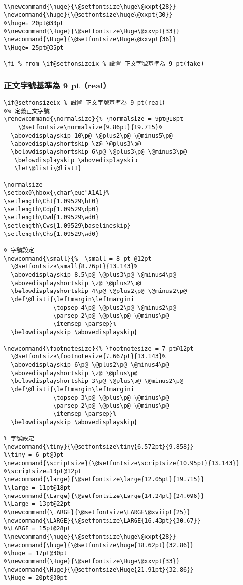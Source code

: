 \begin{lstlisting}[firstnumber=143]
	%		因正文夾注排版需要特將此設定爲 2 倍行距为宜

%\newcommand{\huge}{\@setfontsize\huge\@xxpt{28}}
\newcommand{\huge}{\@setfontsize\huge\@xxpt{30}}    				    %\huge= 20pt@30pt
%\newcommand{\Huge}{\@setfontsize\Huge\@xxvpt{33}}
\newcommand{\Huge}{\@setfontsize\Huge\@xxvpt{36}}   				    %\Huge= 25pt@36pt

\fi % from \if@setfonsizeix % 設置 正文字號基準為 9 pt(fake)
\end{lstlisting}

\subsubsection{正文字號基準為 9 pt（real）}
\begin{lstlisting}[firstnumber=199]
\if@setfonsizeix % 設置 正文字號基準為 9 pt(real)
%% 定義正文字號
\renewcommand{\normalsize}{% \normalsize = 9pt@18pt
    \@setfontsize\normalsize{9.86pt}{19.715}%
  \abovedisplayskip 10\p@ \@plus2\p@ \@minus5\p@
  \abovedisplayshortskip \z@ \@plus3\p@
  \belowdisplayshortskip 6\p@ \@plus3\p@ \@minus3\p@
   \belowdisplayskip \abovedisplayskip
   \let\@listi\@listI}

\normalsize
\setbox0\hbox{\char\euc"A1A1}%
\setlength\Cht{1.09529\ht0}
\setlength\Cdp{1.09529\dp0}
\setlength\Cwd{1.09529\wd0}
\setlength\Cvs{1.09529\baselineskip}
\setlength\Chs{1.09529\wd0}

% 字號設定
\newcommand{\small}{%  \small = 8 pt @12pt
  \@setfontsize\small{8.76pt}{13.143}%
  \abovedisplayskip 8.5\p@ \@plus3\p@ \@minus4\p@
  \abovedisplayshortskip \z@ \@plus2\p@
  \belowdisplayshortskip 4\p@ \@plus2\p@ \@minus2\p@
  \def\@listi{\leftmargin\leftmargini
              \topsep 4\p@ \@plus2\p@ \@minus2\p@
              \parsep 2\p@ \@plus\p@ \@minus\p@
              \itemsep \parsep}%
  \belowdisplayskip \abovedisplayskip}

\newcommand{\footnotesize}{% \footnotesize = 7 pt@12pt
  \@setfontsize\footnotesize{7.667pt}{13.143}%
  \abovedisplayskip 6\p@ \@plus2\p@ \@minus4\p@
  \abovedisplayshortskip \z@ \@plus\p@
  \belowdisplayshortskip 3\p@ \@plus\p@ \@minus2\p@
  \def\@listi{\leftmargin\leftmargini
              \topsep 3\p@ \@plus\p@ \@minus\p@
              \parsep 2\p@ \@plus\p@ \@minus\p@
              \itemsep \parsep}%
  \belowdisplayskip \abovedisplayskip}

% 字號設定
\newcommand{\tiny}{\@setfontsize\tiny{6.572pt}{9.858}}					    %\tiny = 6 pt@9pt
\newcommand{\scriptsize}{\@setfontsize\scriptsize{10.95pt}{13.143}} %\scriptsize=10pt@12pt
\newcommand{\large}{\@setfontsize\large{12.05pt}{19.715}}				      %\large = 11pt@18pt
\newcommand{\Large}{\@setfontsize\Large{14.24pt}{24.096}}				      %\Large = 13pt@22pt
%\newcommand{\LARGE}{\@setfontsize\LARGE\@xviipt{25}}
\newcommand{\LARGE}{\@setfontsize\LARGE{16.43pt}{30.67}}  			    %\LARGE = 15pt@28pt
%\newcommand{\huge}{\@setfontsize\huge\@xxpt{28}}
\newcommand{\huge}{\@setfontsize\huge{18.62pt}{32.86}}    				    %\huge = 17pt@30pt
%\newcommand{\Huge}{\@setfontsize\Huge\@xxvpt{33}}
\newcommand{\Huge}{\@setfontsize\Huge{21.91pt}{32.86}}   				    %\Huge = 20pt@30pt


\end{lstlisting}
